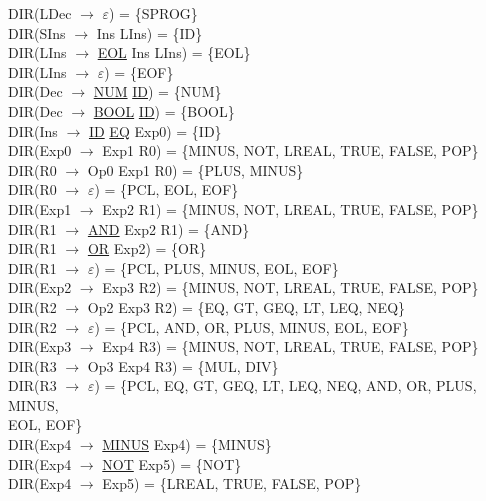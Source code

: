\documentclass[\main/MemoriaPL.tex]{subfiles}
\begin{document}
    DIR(LDec $\rightarrow$ $\varepsilon$) = \{SPROG\}\\
    DIR(SIns $\rightarrow$ Ins LIns) = \{ID\}\\
    DIR(LIns $\rightarrow$ \underline{EOL} Ins LIns) = \{EOL\}\\
    DIR(LIns $\rightarrow$ $\varepsilon$) = \{EOF\}\\
    DIR(Dec $\rightarrow$ \underline{NUM} \underline{ID}) = \{NUM\}\\
    DIR(Dec $\rightarrow$ \underline{BOOL} \underline{ID}) = \{BOOL\}\\
    DIR(Ins $\rightarrow$ \underline{ID} \underline{EQ} Exp0) = \{ID\}\\
    DIR(Exp0 $\rightarrow$ Exp1 R0) = \{MINUS, NOT, LREAL, TRUE, FALSE, POP\}\\
    DIR(R0 $\rightarrow$ Op0 Exp1 R0) = \{PLUS, MINUS\}\\
    DIR(R0 $\rightarrow$ $\varepsilon$) = \{PCL, EOL, EOF\}\\
    DIR(Exp1 $\rightarrow$ Exp2 R1) = \{MINUS, NOT, LREAL, TRUE, FALSE, POP\}\\
    DIR(R1 $\rightarrow$ \underline{AND} Exp2 R1) = \{AND\}\\
    DIR(R1 $\rightarrow$ \underline{OR} Exp2) = \{OR\}\\
    DIR(R1 $\rightarrow$ $\varepsilon$) = \{PCL, PLUS, MINUS, EOL, EOF\}\\
    DIR(Exp2 $\rightarrow$ Exp3 R2) = \{MINUS, NOT, LREAL, TRUE, FALSE, POP\}\\
    DIR(R2 $\rightarrow$ Op2 Exp3 R2) = \{EQ, GT, GEQ, LT, LEQ, NEQ\}\\
    DIR(R2 $\rightarrow$ $\varepsilon$) = \{PCL, AND, OR, PLUS, MINUS, EOL, EOF\}\\
    DIR(Exp3 $\rightarrow$ Exp4 R3) = \{MINUS, NOT, LREAL, TRUE, FALSE, POP\}\\
    DIR(R3 $\rightarrow$ Op3 Exp4 R3) = \{MUL, DIV\}\\
    DIR(R3 $\rightarrow$ $\varepsilon$) = \{PCL, EQ, GT, GEQ, LT, LEQ, NEQ, AND, OR, PLUS, MINUS,\\
    \hspace{31mm}EOL, EOF\}\\
    DIR(Exp4 $\rightarrow$ \underline{MINUS} Exp4) = \{MINUS\}\\
    DIR(Exp4 $\rightarrow$ \underline{NOT} Exp5) = \{NOT\}\\
    DIR(Exp4 $\rightarrow$ Exp5) = \{LREAL, TRUE, FALSE, POP\}\\
\end{document}
